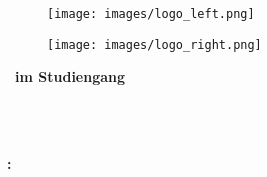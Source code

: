\title{\titel}
\author{\autor}

\setcounter{secnumdepth}{3}
\setcounter{tocdepth}{3}

\fancyfoot[OR]{}%
\fancyfoot[EL]{}%
\fancyfoot[OL]{}%
\fancyfoot[ER]{}%

\begin{titlepage}
\begin{figure}
    \begin{minipage}{0.2\textwidth}
        \begin{flushleft}    
            \texttt{[image: images/logo\_left.png]}
        \end{flushleft}
    \end{minipage}  
    \begin{minipage}{0.55\textwidth}
        \centering
        \hspace{0.25cm}
    \end{minipage}
    \begin{minipage}{0.2\textwidth}
        \begin{flushleft}   
            \texttt{[image: images/logo\_right.png]}
        \end{flushleft}
    \end{minipage} 
\end{figure}
\begin{center}
    \vspace*{0cm}
    \huge{\textbf{\type~im Studiengang \studypath}}
\end{center}
\begin{center}
    \vspace{1cm}
    \Huge{\textbf{\titel}}
    \vspace{1cm}
\end{center}
\begin{center}
    \vspace{1cm}
    \huge{\textbf{\autor\\}}
    \vspace{1cm}
    \LARGE{\matnr\\}
    \vspace{0,5cm}
    \LARGE{\email}
\end{center}
\vspace{1cm}
\begin{center}
    \centering
    \LARGE{\textbf{\advisor: \supervisor}} \\
\end{center}
\vspace{0.5cm}
\begin{flushright}
\end{flushright}
\begin{center}
    \small{\workgroup  \textbullet  \institute \\ \university }
\end{center}
\end{titlepage}
\restoregeometry
